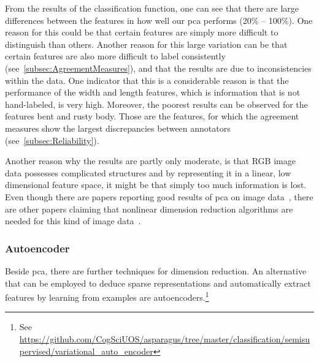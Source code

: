 \bigskip
From the results of the classification function, one can see that there are large differences between the features in how well our \acrshort{pca} performs (20\% -- 100\%).
One reason for this could be that certain features are simply more difficult to distinguish than others. Another reason for this large variation can be that certain features are also more difficult to label consistently (see~\autoref{subsec:AgreementMeasures}), and that the results are due to inconsistencies within the data. One indicator that this is a considerable reason is that the performance of the width and length features, which is information that is not hand-labeled, is very high. Moreover, the poorest results can be observed for the features bent and rusty body. Those are the features, for which the agreement measures show the largest discrepancies between annotators (see~\autoref{subsec:Reliability}).  

\bigskip
Another reason why the results are partly only moderate, is that RGB image data possesses complicated structures and by representing it in a linear, low dimensional feature space, it might be that simply too much information is lost. Even though there are papers reporting good results of \acrshort{pca} on image data~\citep{turk1991face,lata2009}, there are other papers claiming that nonlinear dimension reduction algorithms are needed for this kind of image data~\citep{olaode2014}.


\subsubsection{Autoencoder}
\label{subsec:Autoencoder}

Beside \acrshort{pca}, there are further techniques for dimension reduction. An alternative that can be employed to deduce sparse representations and automatically extract features by learning from examples are autoencoders.\footnote{See \url{https://github.com/CogSciUOS/asparagus/tree/master/classification/semisupervised/variational\_auto\_encoder}}

